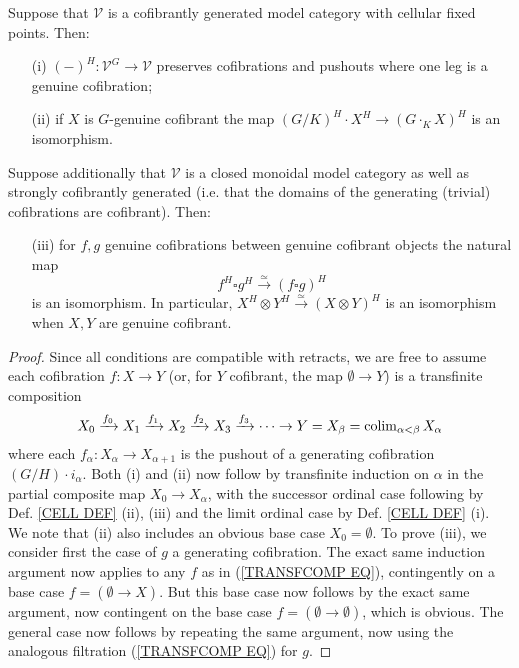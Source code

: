 \documentclass[a4paper,10pt]{article}%
\begin{document}
\begin{proposition}\label{STRONGCELL PROP}
  Suppose that $\mathcal{V}$ is a cofibrantly generated model category with cellular fixed points. Then:
  \begin{itemize}
  \item[(i)] $(\minus)^H \colon \mathcal{V}^G \to \mathcal{V}$ preserves cofibrations and pushouts where one leg
    is a genuine cofibration;
  \item[(ii)] if $X$ is $G$-genuine cofibrant the map 
    $(G/K)^H \cdot X^H \to (G \cdot_K X)^H$ is an isomorphism.
  \end{itemize}
  Suppose additionally that $\mathcal{V}$ is a 
  closed monoidal model category
  as well as strongly cofibrantly generated
  (i.e. that the domains of the generating (trivial) cofibrations are cofibrant). Then:
  \begin{itemize}
  \item[(iii)] for $f,g$ genuine cofibrations between genuine cofibrant objects the natural map 
    \[f^H \square g^H \xrightarrow{\simeq} (f \square g)^H\]
    is an isomorphism.
    In particular, $X^H \otimes Y^H \xrightarrow{\simeq} 
    (X \otimes Y)^H$ is an isomorphism when $X,Y$ are genuine cofibrant.
  \end{itemize}
\end{proposition}


\begin{proof}
  Since all conditions are compatible with retracts, we are free to assume each cofibration $f\colon X \to Y$
  (or, for $Y$ cofibrant, the map $\emptyset \to Y$)
  is a transfinite composition
  \begin{equation}\label{TRANSFCOMP EQ}
    X_0 \xrightarrow{f_0} 
    X_1 \xrightarrow{f_1}
    X_2 \xrightarrow{f_2}
    X_3 \xrightarrow{f_3} 
    \cdots
    \to Y = X_{\beta} = \operatorname{colim}_{\alpha < \beta} X_{\alpha}
  \end{equation}
  where each $f_{\alpha} \colon X_{\alpha} \to X_{\alpha+1}$
  is the pushout of a generating cofibration
  $(G/H) \cdot i_{\alpha}$. Both (i) and (ii) now follow by transfinite induction on $\alpha$ in the partial composite map
  $X_0 \to X_{\alpha}$, with the successor ordinal case following by Def. \ref{CELL DEF} (ii), (iii) and the limit ordinal case by
  Def. \ref{CELL DEF} (i). We note that (ii) also includes an obvious base case $X_0=\emptyset$.
  To prove (iii), we consider first the case of $g$ a generating cofibration. The exact same induction argument now applies to any $f$ as in (\ref{TRANSFCOMP EQ}), contingently on a base case $f=(\emptyset \to X)$. But this base case now follows by the exact same argument, now contingent on the base case $f=(\emptyset \to \emptyset)$, which is obvious.
  The general case now follows by repeating the same argument, now using the analogous filtration (\ref{TRANSFCOMP EQ}) for $g$.
\end{proof}
\end{document}
